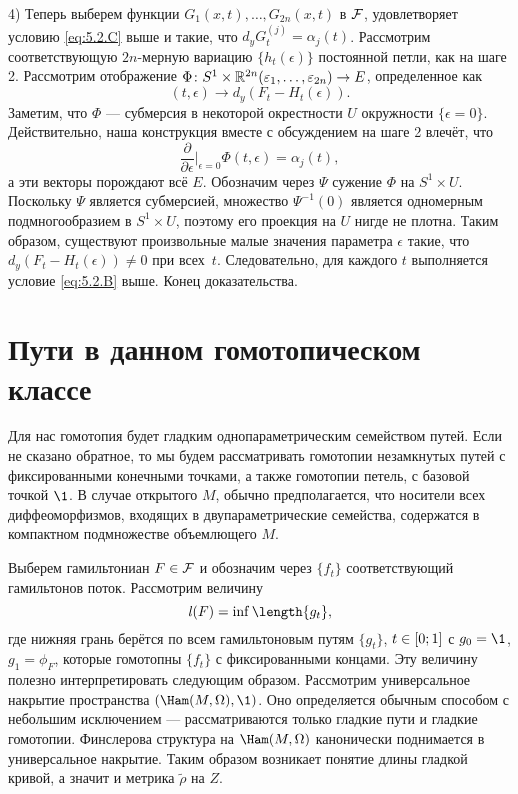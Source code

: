 4) Теперь выберем функции $G_1(x,t),\dots, G_{2n}(x,t)$ в $\mathcal{F}$, удовлетворяет условию \ref{eq:5.2.C} выше и такие, что $d_y G_t^{(j)} = \alpha_j (t)$.
Рассмотрим соответствующую $2n$-мерную вариацию $\{h_t (\epsilon)\}$ постоянной петли, как на шаге 2.
Рассмотрим отображение $\Phi\colon S^1 \times \mathbb{R}^{2n} (\varepsilon_1 ,\dots, \varepsilon_{2n}) \to E$, определенное как 
\[(t, \epsilon) \to d_y (F_t - H_t (\epsilon)).\]
Заметим, что $\Phi$ --- субмерсия в некоторой окрестности $U$ окружности $\{\epsilon = 0\}$.
Действительно, наша конструкция вместе с обсуждением на шаге 2 влечёт, что 
\[\frac{\partial}{\partial\epsilon}|_{\epsilon = 0} \Phi (t, \epsilon) = \alpha_j (t),\]
а эти векторы порождают всё $E$.
Обозначим через $\Psi$ сужение $\Phi$ на $S^1 \times U$.
Поскольку $\Psi$ является субмерсией, множество $\Psi^{-1} (0)$ является одномерным подмногообразием в $S^1 \times U$, поэтому его проекция на $U$ нигде не плотна.
Таким образом, существуют произвольные малые значения параметра $\epsilon$ такие, что $d_y (F_t - H_t (\epsilon)) \ne 0$ при всех~$t$.
Следовательно, для каждого $t$ выполняется условие \ref{eq:5.2.B} выше.
Конец доказательства.
\qeds

\section{Пути в данном гомотопическом классе}

Для нас гомотопия будет гладким однопараметрическим семейством путей.
Если не сказано обратное, то мы будем рассматривать гомотопии незамкнутых путей с фиксированными конечными точками, а также гомотопии петель, с базовой точкой $\1$.
В случае открытого $M$, обычно предполагается, что носители всех диффеоморфизмов, входящих в двупараметрические семейства, содержатся в компактном подмножестве объемлющего $M$.

Выберем гамильтониан $F \in \mathcal{F}$ и обозначим через $\{f_t\}$ соответствующий гамильтонов поток.
Рассмотрим величину \[\l(F) = \inf \length \{g_t\},\] где нижняя грань берётся по всем гамильтоновым путям $\{g_t\}$, $t \z\in [0; 1]$ с $g_0 = \1$, $g_1 = \phi_F$, которые гомотопны $\{f_t\}$ с фиксированными концами.
Эту величину полезно интерпретировать следующим образом.
Рассмотрим универсальное накрытие  пространства $(\Ham (M, \Omega), \1)$.
Оно определяется обычным способом с небольшим исключением --- рассматриваются только гладкие пути и гладкие гомотопии.
Финслерова структура на $\Ham (M, \Omega)$ канонически поднимается в универсальное накрытие.
Таким образом возникает понятие длины гладкой кривой, а значит и метрика $\tilde\rho$ на $Z$.

